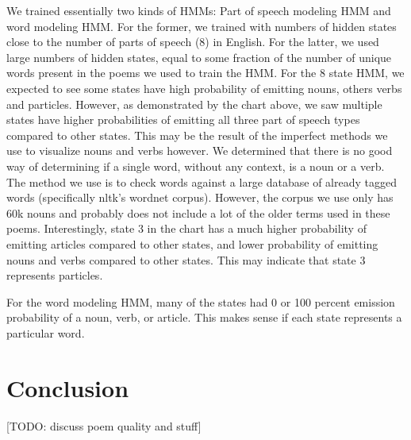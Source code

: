 We trained essentially two kinds of HMMs: Part of speech modeling HMM and word modeling HMM. For the former, we trained with numbers of hidden states close to the number of parts of speech (8) in English. For the latter, we used large numbers of hidden states, equal to some fraction of the number of unique words present in the poems we used to train the HMM.  For the 8 state HMM, we expected to see some states have high probability of emitting nouns, others verbs and particles. However, as demonstrated by the chart above, we saw multiple states have higher probabilities of emitting all three part of speech types compared to other states. This may be the result of the imperfect methods we use to visualize nouns and verbs however. We determined that there is no good way of determining if a single word, without any context, is a noun or a verb. The method we use is to check words against a large database of already tagged words (specifically nltk's wordnet corpus). However, the corpus we use only has 60k nouns and probably does not include a lot of the older terms used in these poems. Interestingly, state 3 in the chart has a much higher probability of emitting articles compared to other states, and lower probability of emitting nouns and verbs compared to other states. This may indicate that state 3 represents particles. 

For the word modeling HMM, many of the states had 0 or 100 percent emission probability of a noun, verb, or article. This makes sense if each state represents a particular word. 
\section{Conclusion}
[TODO: discuss poem quality and stuff]



